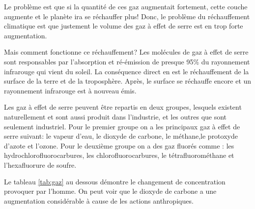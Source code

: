 \documentclass[a4paper,11pt]{article}
\begin{document}
Le problème est que si la quantité de ces gaz augmentait fortement, cette couche
augmente et le planète ira se réchauffer plus! 
Donc, le  problème du réchauffement climatique  est que justement  le volume des
gaz à effet de serre est en trop forte augmentation.

Mais comment fonctionne ce réchauffement? Les molécules de gaz à effet de serre sont responsables par l'absorption et
ré-émission de presque 95\% du rayonnement infrarouge qui vient du soleil.  La conséquence direct en est le réchauffement de la
surface de la terre et de la troposphère. Après, le surface se réchauffe encore et un
rayonnement infrarouge est à nouveau émis. 





Les  gaz à  effet  de serre  peuvent  être repartis  en  deux groupes,  lesquels
existent naturellement et sont aussi produit dans l'industrie, et les outres que
sont seulement industriel.
Pour le premier groupe on a les principaux gaz à effet de serre suivant:
le vapeur d'eau, le dioxyde de carbone, le méthane,le protoxyde d'azote et l'ozone.
Pour le deuxième groupe on a des gaz fluorés comme :
les hydrochlorofluorocarbures, 
les chlorofluorocarbures, 
le tétrafluorométhane et
l'hexafluorure de soufre.

Le  tableau \ref{tab:gaz}  au dessous  démontre le  changement  de concentration
provoquer par l'homme. On peut voir que le dioxyde de carbone a une augmentation
considérable à cause de les actions anthropiques. 
\end{document}
